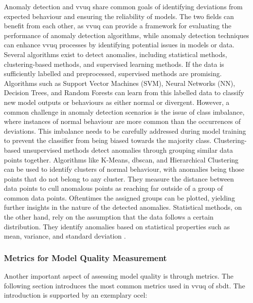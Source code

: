Anomaly detection and \gls{vvuq} share common goals of identifying deviations from expected behaviour and ensuring the reliability of models. The two fields can benefit from each other, as \gls{vvuq} can provide a framework for evaluating the performance of anomaly detection algorithms, while anomaly detection techniques can enhance \gls{vvuq} processes by identifying potential issues in models or data.
Several algorithms exist to detect anomalies, including statistical methods, clustering-based methods, and supervised learning methods. If the data is sufficiently labelled and preprocessed, supervised methods are promising. Algorithms such as Support Vector Machines (SVM), Neural Networks (NN), Decision Trees, and Random Forests can learn from this labelled data to classify new model outputs or behaviours as either normal or divergent. However, a common challenge in anomaly detection scenarios is the issue of class imbalance, where instances of normal behaviour are more common than the occurrences of deviations. This imbalance needs to be carefully addressed during model training to prevent the classifier from being biased towards the majority class. Clustering-based unsupervised methods detect anomalies through grouping similar data points together. Algorithms like K-Means, \gls{dbscan}, and Hierarchical Clustering can be used to identify clusters of normal behaviour, with anomalies being those points that do not belong to any cluster. They measure the distance between data points to cull anomalous points as reaching far outside of a group of common data points. Oftentimes the assigned groups can be plotted, yielding further insights in the nature of the detected anomalies. Statistical methods, on the other hand, rely on the assumption that the data follows a certain distribution. They identify anomalies based on statistical properties such as mean, variance, and standard deviation \autocite{chandola2009anomaly}.

\subsubsection*{Metrics for Model Quality Measurement}
\label{sec:metrics-theory}
Another important aspect of assessing model quality is through metrics. The following section introduces the most common metrics used in \gls{vvuq} of \gls{sbdt}. The introduction is supported by an exemplary \gls{ocel}:

